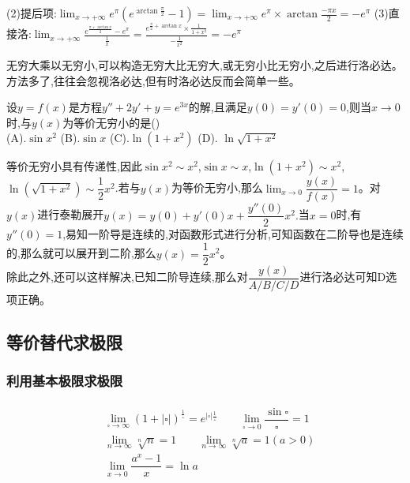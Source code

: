 \documentclass[10pt, a4paper, oneside, UTF8]{ctexbook}
\begin{document}
\begin{sloppypar}
\begin{solution}
        (2)提后项:$\lim_{x\to +\infty}e^\pi(e^{\arctan \frac{\pi}{2}}-1)=\lim_{x\to +\infty}e^\pi\times\arctan \frac{-\pi x}{2}=-e^\pi$\newline
        (3)直接洛:$\lim_{x\to +\infty}\frac{e^{\frac{\pi+\arctan x}{2}}-e^\pi}{\frac{1}{x}}=\frac{e^{\frac{\pi}{2}+\arctan x}\times\frac{1}{1+x^{2}}}{-\frac{1}{x^{2}}}=-e^\pi$\newline
    \end{solution}
    \begin{note}
        无穷大乘以无穷小,可以构造无穷大比无穷大,或无穷小比无穷小,之后进行洛必达。方法多了,往往会忽视洛必达,但有时洛必达反而会简单一些。
    \end{note}
    \begin{problem}
        设$y=f(x)$是方程$y''+2y'+y=e^{3x}$的解,且满足$y(0)=y'(0)=0$,则当$x\to 0$时,与$y(x)$为等价无穷小的是()\\
        (A).$\sin x^2$ \qquad (B).$\sin x$ \qquad (C).$\ln(1+x^2)$ \qquad (D). $\ln \sqrt{1+x^2}$
    \end{problem}
    \begin{solution}
        等价无穷小具有传递性,因此$\sin x^2 \sim x^2$,$\sin x \sim x$,$\ln (1+x^2) \sim x^2$,$\ln (\sqrt{1+x^2})\sim \dfrac{1}{2}x^2$.若与$y(x)$为等价无穷小,那么$\lim_{x\to 0}\dfrac{y(x)}{f(x)}=1$。对$y(x)$进行泰勒展开$y(x)=y(0)+y'(0)x+\dfrac{y''(0)}{2}x^2.$当$x=0$时,有$y''(0)=1$,易知一阶导是连续的,对函数形式进行分析,可知函数在二阶导也是连续的,那么就可以展开到二阶,那么$y(x)=\dfrac{1}{2}x^2$。\\
        除此之外,还可以这样解决,已知二阶导连续,那么对$\dfrac{y(x)}{A/B/C/D}$进行洛必达可知D选项正确。
    \end{solution}
    \subsection{等价替代求极限}
    \subsubsection{利用基本极限求极限}
    \begin{align*} \boxed
        {
            \begin{aligned}
                 & \lim_{\square \to \infty }(1+|\square|)^{\frac{1}{\square}}=e^{|\square| \frac{1}{\square}} \qquad     \lim _ { \square \rightarrow 0 } \dfrac { \sin \square } { \square } = 1 \\
                 & \lim_{n \to \infty }\sqrt[n]{n}=1 \qquad \lim_{n \to \infty} \sqrt[n]{a}=1(a>0)                                                                                                \\
                 & \lim_{x \to 0} \dfrac{a^x-1}{x}=\ln a
            \end{aligned}
        }
    \end{align*}

\end{sloppypar}
\end{document}
